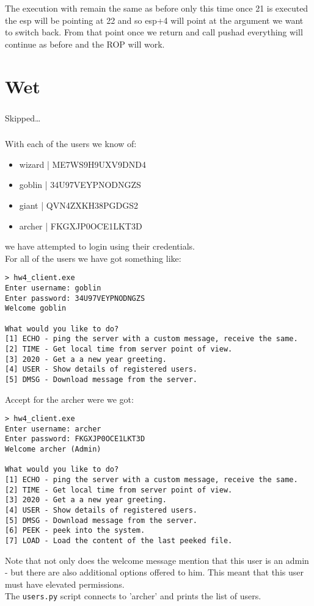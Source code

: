 \documentclass{article}
\begin{document}
The execution with remain the same as before only this time once 21 is executed the
esp will be pointing at 22 and so esp+4 will point at the argument we want to switch
back. From that point once we return and call pushad everything will continue as before
and the ROP will work.

\part{Wet}
\setcounter{section}{0}
\section{}
Skipped\dots
\section{}
With each of the users we know of:
\begin{itemize}
    \item wizard | ME7WS9H9UXV9DND4
    \item goblin | 34U97VEYPNODNGZS
    \item giant | QVN4ZXKH38PGDGS2
    \item archer | FKGXJP0OCE1LKT3D
\end{itemize}
we have attempted to login using their credentials.\\
For all of the users we have got something like:
\begin{lstlisting}
> hw4_client.exe
Enter username: goblin
Enter password: 34U97VEYPNODNGZS
Welcome goblin

What would you like to do?
[1] ECHO - ping the server with a custom message, receive the same.
[2] TIME - Get local time from server point of view.
[3] 2020 - Get a a new year greeting.
[4] USER - Show details of registered users.
[5] DMSG - Download message from the server.
\end{lstlisting}
Accept for the archer were we got:
\begin{lstlisting}
> hw4_client.exe
Enter username: archer
Enter password: FKGXJP0OCE1LKT3D
Welcome archer (Admin)

What would you like to do?
[1] ECHO - ping the server with a custom message, receive the same.
[2] TIME - Get local time from server point of view.
[3] 2020 - Get a a new year greeting.
[4] USER - Show details of registered users.
[5] DMSG - Download message from the server.
[6] PEEK - peek into the system.
[7] LOAD - Load the content of the last peeked file.
\end{lstlisting}
Note that not only does the welcome message mention that this user is an admin
- but there are also additional options offered to him. This meant that this 
user must have elevated permissions.\\
The \texttt{users.py} script connects to 'archer' and prints the list of users.
\end{document}
